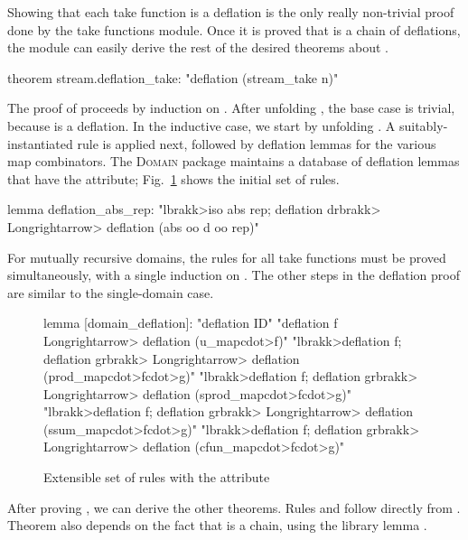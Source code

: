 Showing that each take function is a deflation is the only really non-trivial proof done by the take functions module. Once it is proved that  is a chain of deflations, the module can easily derive the rest of the desired theorems about .
%
\begin{isacode}
theorem stream.deflation_take: "deflation (stream_take n)"
\end{isacode}
%
The proof of  proceeds by induction on . After unfolding , the base case is trivial, because  is a deflation. In the inductive case, we start by unfolding . A suitably-instantiated rule  is applied next, followed by deflation lemmas for the various map combinators. The \textsc{Domain} package maintains a database of deflation lemmas that have the  attribute; Fig.~\ref{fig:domain-deflation} shows the initial set of  rules.
%
\begin{isacode}
lemma deflation_abs_rep:
  "\<lbrakk>iso abs rep; deflation d\<rbrakk> \<Longrightarrow> deflation (abs oo d oo rep)"
\end{isacode}
%
For mutually recursive domains, the  rules for all take functions must be proved simultaneously, with a single induction on . The other steps in the deflation proof are similar to the single-domain case.

\begin{figure}
\begin{isacode}
lemma [domain_deflation]:
  "deflation ID"
  "deflation f \<Longrightarrow> deflation (u_map\<cdot>f)"
  "\<lbrakk>deflation f; deflation g\<rbrakk> \<Longrightarrow> deflation (prod_map\<cdot>f\<cdot>g)"
  "\<lbrakk>deflation f; deflation g\<rbrakk> \<Longrightarrow> deflation (sprod_map\<cdot>f\<cdot>g)"
  "\<lbrakk>deflation f; deflation g\<rbrakk> \<Longrightarrow> deflation (ssum_map\<cdot>f\<cdot>g)"
  "\<lbrakk>deflation f; deflation g\<rbrakk> \<Longrightarrow> deflation (cfun_map\<cdot>f\<cdot>g)"
\end{isacode}
\caption{Extensible set of rules with the  attribute}
\label{fig:domain-deflation}
\end{figure}

After proving , we can derive the other theorems. Rules  and  follow directly from . Theorem  also depends on the fact that  is a chain, using the library lemma .

